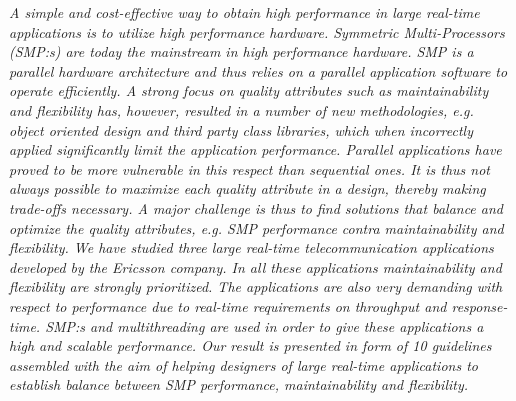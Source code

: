 \documentclass{article}
\begin{document}
\emph{A simple and cost-effective way to obtain high performance in large real-time
applications is to utilize high performance hardware. Symmetric
Multi-Processors (SMP:s) are today the mainstream in high performance hardware.
SMP is a parallel hardware architecture and thus relies on a parallel
application software to operate efficiently. A strong focus on quality
attributes such as maintainability and flexibility has, however, resulted in a
number of new methodologies, e.g. object oriented design and third party class
libraries, which when incorrectly applied significantly limit the application
performance.  Parallel applications have proved to be more vulnerable in this
respect than sequential ones. It is thus not always possible to maximize each
quality attribute in a design, thereby making trade-offs necessary. A major
challenge is thus to find solutions that balance and optimize the quality
attributes, e.g. SMP performance contra maintainability and flexibility.  We
have studied three large real-time telecommunication applications developed by
the Ericsson company. In all these applications maintainability and flexibility
are strongly prioritized. The applications are also very demanding with respect
to performance due to real-time requirements on throughput and response-time.
SMP:s and multithreading are used in order to give these applications a high
and scalable performance.  Our result is presented in form of 10 guidelines
assembled with the aim of helping designers of large real-time applications to
establish balance between SMP performance, maintainability and flexibility.}
\end{document}
